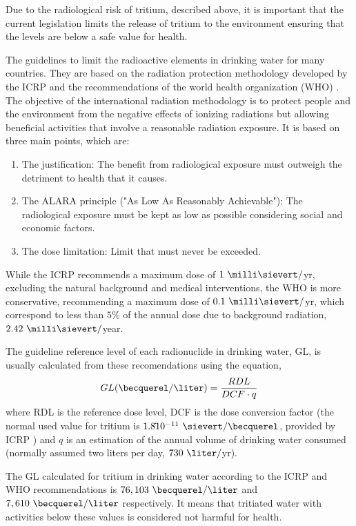 Due to the radiological risk of tritium, described above, it is important that the current legislation limits the release of tritium to the environment ensuring that the levels are below a safe value for health.

The guidelines to limit the radioactive elements in drinking water for many countries. They are based on the radiation protection methodology developed by the ICRP \cite{ICRP_GL} and the recommendations of the world health organization (WHO) \cite{WHO_GL}. The objective of the international radiation methodology is to  protect people and the environment from the negative effects of ionizing radiations but allowing beneficial activities that involve a reasonable radiation exposure. It is based on three main points, which are:
\begin{enumerate}
\item{} The justification: The benefit from radiological exposure must outweigh the detriment to health that it causes.
\item{} The ALARA principle ("As Low As Reasonably Achievable"): The radiological exposure must be kept as low as possible considering social and economic factors.
\item{} The dose limitation: Limit that must never be exceeded.
\end{enumerate}

While the ICRP recommends a maximum dose of $1~\milli\sievert/$yr, excluding the natural background and medical interventions, the WHO is more conservative, recommending a maximum dose of $0.1~\milli\sievert/$yr, which correspond to less than $5\%$ of the annual dose due to background radiation, $2.42~\milli\sievert/$year.

The guideline reference level of each radionuclide in drinking water, GL, is usually calculated from these recomendations using the equation,
\begin{equation}
GL (\becquerel/\liter) = \frac{RDL}{DCF \cdot{} q}
\label{eq:Guideline}
\end{equation}
where RDL is the reference dose level, DCF is the dose conversion factor (the normal used value for tritium is $1.8 \dot{} 10^{-11}~\sievert/ \becquerel$, provided by ICRP \cite{ICRP_factor}) and $q$ is an estimation of the annual volume of drinking water consumed (normally assumed two liters per day, $730~\liter/$yr).

The GL calculated for tritium in drinking water according to the ICRP and WHO recommendations is $76,103~\becquerel/\liter$ and $7,610~\becquerel/\liter$  respectively. It means that tritiated water with activities below these values is considered not harmful for health.

